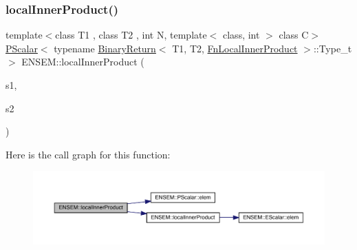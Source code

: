 \subsubsection{\texorpdfstring{localInnerProduct()}{localInnerProduct()}}
{\footnotesize\ttfamily template$<$class T1 , class T2 , int N, template$<$ class, int $>$ class C$>$ \\
\mbox{\hyperlink{classENSEM_1_1PScalar}{P\+Scalar}}$<$ typename \mbox{\hyperlink{structENSEM_1_1BinaryReturn}{Binary\+Return}}$<$ T1, T2, \mbox{\hyperlink{structENSEM_1_1FnLocalInnerProduct}{Fn\+Local\+Inner\+Product}} $>$\+::Type\+\_\+t $>$ E\+N\+S\+E\+M\+::local\+Inner\+Product (\begin{DoxyParamCaption}\item[{const \mbox{\hyperlink{classENSEM_1_1PVector}{P\+Vector}}$<$ T1, \mbox{\hyperlink{operator__name__util_8cc_a7722c8ecbb62d99aee7ce68b1752f337}{N}}, C $>$ \&}]{s1,  }\item[{const \mbox{\hyperlink{classENSEM_1_1PVector}{P\+Vector}}$<$ T2, \mbox{\hyperlink{operator__name__util_8cc_a7722c8ecbb62d99aee7ce68b1752f337}{N}}, C $>$ \&}]{s2 }\end{DoxyParamCaption})\hspace{0.3cm}{\ttfamily [inline]}}

Here is the call graph for this function\+:\nopagebreak
\begin{figure}[H]
\begin{center}
\leavevmode
\includegraphics[width=350pt]{d3/dc4/group__primvector_gabdc482461364fd471e22ddd6c0e1c2dd_cgraph}
\end{center}
\end{figure}
\mbox{\label{group__primvector_gad425d93792f21129cff7411c89c12d80}} 
